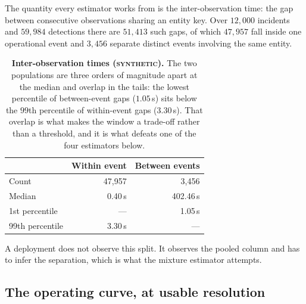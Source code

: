 \documentclass[11pt,a4paper]{article}
\newcommand{\synth}{\textsc{synthetic}}
\begin{document}
The quantity every estimator works from is the inter-observation time: the gap
between consecutive observations sharing an entity key. Over $12{,}000$
incidents and $59{,}984$ detections there are $51{,}413$ such gaps, of which
$47{,}957$ fall inside one operational event and $3{,}456$ separate distinct
events involving the same entity.

\begin{table}[h]
\centering\small
\begin{tabular}{lrr}
\toprule
& \textbf{Within event} & \textbf{Between events} \\
\midrule
Count & 47{,}957 & 3{,}456 \\
Median & 0.40\,s & 402.46\,s \\
1st percentile & --- & 1.05\,s \\
99th percentile & 3.30\,s & --- \\
\bottomrule
\end{tabular}
\caption{\textbf{Inter-observation times (\synth).} The two populations are
three orders of magnitude apart at the median and overlap in the tails: the
lowest percentile of between-event gaps ($1.05$\,s) sits below the $99$th
percentile of within-event gaps ($3.30$\,s). That overlap is what makes the
window a trade-off rather than a threshold, and it is what defeats one of the
four estimators below.}
\label{tab:iot}
\end{table}

A deployment does not observe this split. It observes the pooled column and has
to infer the separation, which is what the mixture estimator attempts.

\subsection{The operating curve, at usable resolution}
\label{sec:curve}
\end{document}

